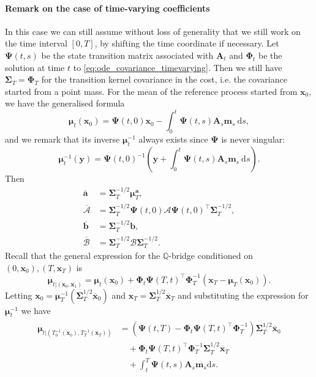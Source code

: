 \documentclass{article}
\newcommand{\diff}{\mathrm{d}}
\newcommand{\Ac}{\mathcal{A}}
\newcommand{\Bc}{\mathcal{B}}
\theoremstyle{newstyle}
\begin{document}
\paragraph{Remark on the case of time-varying coefficients}
In this case we can still assume without loss of generality that we still work on the time interval $[0, T]$, by shifting the time coordinate if necessary. Let $\bm{\Psi}(t, s)$ be the state transition matrix associated with $\bm{A}_t$ and $\bm{\Phi}_t$ be the solution at time $t$ to \eqref{eq:ode_covariance_timevarying}. Then we still have $\bm{\Sigma}_T = \bm{\Phi}_T$ for the transition kernel covariance in the cost, i.e. the covariance started from a point mass. For the mean of the reference process started from $\bm{x}_0$, we have the generalised formula 
\begin{equation}
  \bm{\mu}_t(\bm{x}_0) = \bm{\Psi}(t, 0) \bm{x}_0 - \int_0^t \bm{\Psi}(t, s) \bm{A}_s \bm{m}_s \: \diff s,
\end{equation}
and we remark that its inverse $\bm{\mu}_t^{-1}$ always exists since $\bm{\Psi}$ is never singular:
\begin{equation}
  \bm{\mu}_t^{-1}(\bm{y}) = \bm{\Psi}(t, 0)^{-1} \left( \bm{y} + \int_0^t \bm{\Psi}(t, s) \bm{A}_s \bm{m}_s \: \diff s \right). 
\end{equation}
Then
\begin{align}
  \overline{\bm{a}} &= \bm{\Sigma}_T^{-1/2} \bm{\mu}_T^{\bm{a}}, \\
  \overline{\bm{\Ac}} &= \bm{\Sigma}_T^{-1/2} \bm{\Psi}(t, 0) \bm{\Ac} \bm{\Psi}(t, 0)^\top \bm{\Sigma}_T^{-1/2}, \\
  \overline{\bm{b}} &= \bm{\Sigma}_T^{-1/2} \bm{b}, \\
  \overline{\bm{\Bc}} &= \bm{\Sigma}_T^{-1/2} \bm{\Bc} \bm{\Sigma}_T^{-1/2}. 
\end{align}
Recall that the general expression for the $\mathbb{Q}$-bridge conditioned on $(0, \bm{x}_0), (T, \bm{x}_T)$ is
\begin{equation}
  \bm{\mu}_{t | (\bm{x}_0, \bm{x}_1)} = \bm{\mu}_t(\bm{x}_0) + \bm{\Phi}_t \bm{\Psi}(T, t)^\top \bm{\Phi}_T^{-1} (\bm{x}_T - \bm{\mu}_T(\bm{x}_0)). 
\end{equation} 
Letting $\bm{x}_0 = \bm{\mu}_T^{-1}(\bm{\Sigma}_T^{1/2} \overline{\bm{x}}_0)$ and $\bm{x}_T = \bm{\Sigma}_T^{1/2} \overline{\bm{x}}_T$ and substituting the expression for $\bm{\mu}_t^{-1}$ we have
\begin{align}
  \begin{split}
  \bm{\mu}_{t | (T_0^{-1}(\overline{\bm{x}}_0), T_T^{-1}(\overline{\bm{x}}_T))} &= \left( \bm{\Psi}(t, T) - \bm{\Phi}_t \bm{\Psi}(T, t)^\top \bm{\Phi}_T^{-1} \right) \bm{\Sigma}_T^{1/2} \overline{\bm{x}}_0 \\
                                                                                &\quad + \bm{\Phi}_t \bm{\Psi}(T, t)^\top \bm{\Phi}_T^{-1} \bm{\Sigma}_T^{1/2} \overline{\bm{x}}_T \\
                                                                                &\quad + \int_t^T \bm{\Psi}(t, s) \bm{A}_s \bm{m}_s \diff s.
  \end{split}
\end{align}
\end{document}
